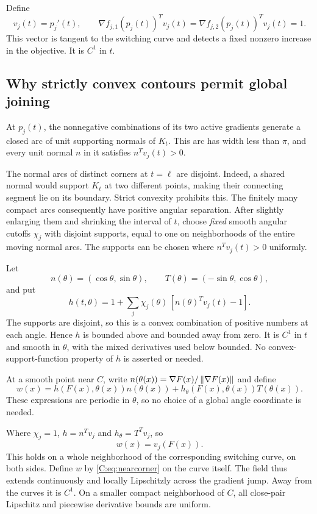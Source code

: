 \documentclass[10pt,oneside,openany]{book}
\theoremstyle{remark}\newtheorem{remark}{Remark}[chapter]
\begin{document}
Define
\begin{equation}\label{C:eq:vel}
 v_j(t)=p_j'(t),\qquad
 \nabla f_{j,1}(p_j(t))^Tv_j(t)
 =\nabla f_{j,2}(p_j(t))^Tv_j(t)=1.
\end{equation}
This vector is tangent to the switching curve and detects a fixed nonzero increase in the objective. It is $C^1$ in $t$.

\subsection{Why strictly convex contours permit global joining}
At $p_j(t)$, the nonnegative combinations of its two active gradients generate a closed arc of unit supporting normals of $K_t$. This arc has width less than $\pi$, and every unit normal $n$ in it satisfies $n^Tv_j(t)>0$.

The normal arcs of distinct corners at $t=\ell$ are disjoint. Indeed, a shared normal would support $K_\ell$ at two different points, making their connecting segment lie on its boundary. Strict convexity prohibits this. The finitely many compact arcs consequently have positive angular separation. After slightly enlarging them and shrinking the interval of $t$, choose \emph{fixed} smooth angular cutoffs $\chi_j$ with disjoint supports, equal to one on neighborhoods of the entire moving normal arcs. The supports can be chosen where $n^Tv_j(t)>0$ uniformly.

Let
\[
 n(\theta)=(\cos\theta,\sin\theta),\qquad
 T(\theta)=(-\sin\theta,\cos\theta),
\]
and put
\begin{equation}\label{C:eq:h}
 h(t,\theta)=1+\sum_j\chi_j(\theta)\,[n(\theta)^Tv_j(t)-1].
\end{equation}
The supports are disjoint, so this is a convex combination of positive numbers at each angle. Hence $h$ is bounded above and bounded away from zero. It is $C^1$ in $t$ and smooth in $\theta$, with the mixed derivatives used below bounded. No convex-support-function property of $h$ is asserted or needed.

At a smooth point near $C$, write $n(\theta(x))=\nabla F(x)/\left\lVert\nabla F(x)\right\rVert$ and define
\begin{equation}\label{C:eq:w}
 w(x)=h(F(x),\theta(x))n(\theta(x))
       +h_\theta(F(x),\theta(x))T(\theta(x)).
\end{equation}
These expressions are periodic in $\theta$, so no choice of a global angle coordinate is needed.

Where $\chi_j=1$, $h=n^Tv_j$ and $h_\theta=T^Tv_j$, so
\begin{equation}\label{C:eq:nearcorner}
 w(x)=v_j(F(x)).
\end{equation}
This holds on a whole neighborhood of the corresponding switching curve, on both sides. Define $w$ by \eqref{C:eq:nearcorner} on the curve itself. The field thus extends continuously and locally Lipschitzly across the gradient jump. Away from the curves it is $C^1$. On a smaller compact neighborhood of $C$, all close-pair Lipschitz and piecewise derivative bounds are uniform.
\end{document}
